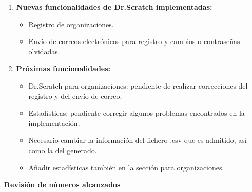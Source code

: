 \documentclass[a4paper,12pt]{letter}
\begin{document}
\begin{letter}
\begin{enumerate}
    \item{\textbf {Nuevas funcionalidades de Dr.Scratch implementadas:}}
    \begin{itemize}
        \item {Registro de organizaciones.}
        \item {Envío de correos electrónicos para registro y cambios o contraseñas olvidadas.}
    \end{itemize}
    
    \item{\textbf {Próximas funcionalidades:}}
    \begin{itemize}
            \item {Dr.Scratch para organizaciones: pendiente de realizar correcciones del registro y del envío de correo.}
            \item {Estadísticas: pendiente corregir algunos problemas encontrados en la implementación.}
            \item {Necesario cambiar la información del fichero .csv que es admitido, así como la del generado.}
            \item {Añadir estadísticas también en la sección para organizaciones.}
    \end{itemize}


\end{enumerate}

\vspace{4cm}
\textbf{{\LARGE Revisión de números alcanzados}}
\vspace{0.5cm}


\end{letter}
\end{document}
